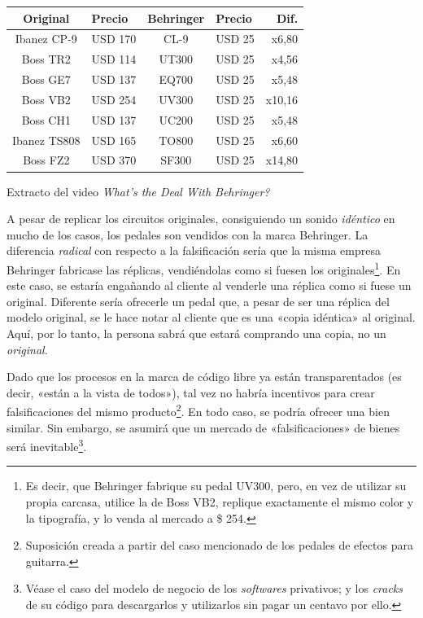 \documentclass[12pt,a4paper]{article}
\begin{document}
\begin{center}
\begin{tabular}{|c|l|c|l|r|}
\hline 
\textbf{Original} & \textbf{Precio} & \textbf{Behringer} & \textbf{Precio} & \textbf{Dif.} \\ 
\hline 
Ibanez CP-9 & USD 170 & CL-9 & USD 25 & x6,80 \\ 
\hline 
Boss TR2 & USD 114 & UT300 & USD 25 & x4,56 \\ 
\hline 
Boss GE7 & USD 137 & EQ700 & USD 25 & x5,48 \\ 
\hline 
Boss VB2 & USD 254 & UV300 & USD 25 & x10,16 \\ 
\hline 
Boss CH1 & USD 137 & UC200 & USD 25 & x5,48 \\ 
\hline 
Ibanez TS808 & USD 165 & TO800 & USD 25 & x6,60 \\ 
\hline 
Boss FZ2 & USD 370 & SF300 & USD 25 & x14,80 \\ 
\hline 
\end{tabular}
\end{center}

\begin{footnotesize}
\begin{flushright}
Extracto del video \textit{What's the Deal With Behringer?} \cite{pedales}
\end{flushright}
\end{footnotesize}

A pesar de replicar los circuitos originales, consiguiendo un sonido \textit{idéntico} en mucho de los casos, los pedales son vendidos con la marca Behringer. La diferencia \textit{radical} con respecto a la falsificación sería que la misma empresa Behringer fabricase las réplicas, vendiéndolas como si fuesen los originales\footnote{Es decir, que Behringer fabrique su pedal UV300, pero, en vez de utilizar su propia carcasa, utilice la de Boss VB2, replique exactamente el mismo color y la tipografía, y lo venda al mercado a \$ 254.}. En este caso, se estaría engañando al cliente al venderle una réplica como si fuese un original. Diferente sería ofrecerle un pedal que, a pesar de ser una réplica del modelo original, se le hace notar al cliente que es una «copia idéntica» al original. Aquí, por lo tanto, la persona sabrá que estará comprando una copia, no un \textit{original}.

Dado que los procesos en la marca de código libre ya están transparentados (es decir, «están a la vista de todos»), tal vez no habría incentivos para crear falsificaciones del mismo producto\footnote{Suposición creada a partir del caso mencionado de los pedales de efectos para guitarra.}. En todo caso, se podría ofrecer una bien similar. Sin embargo, se asumirá que un mercado de «falsificaciones» de bienes será inevitable\footnote{Véase el caso del modelo de negocio de los \textit{softwares} privativos; y los \textit{cracks} de su código para descargarlos y utilizarlos sin pagar un centavo por ello.}.
\end{document}
